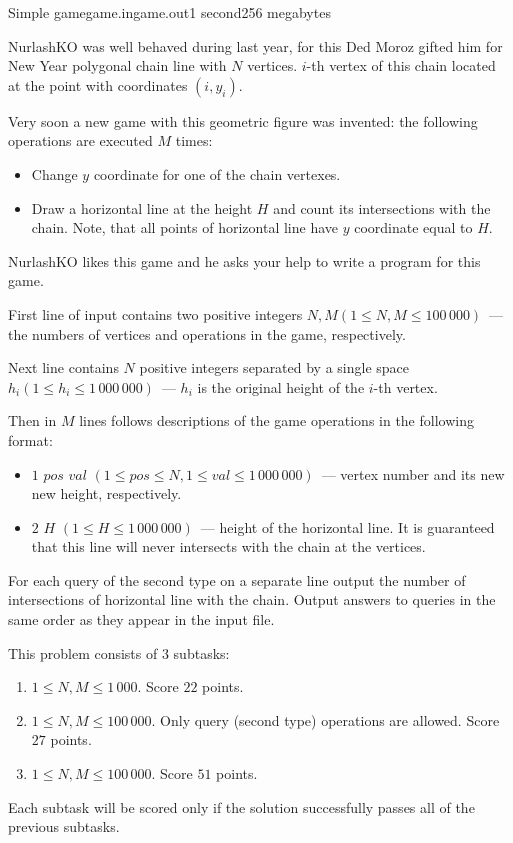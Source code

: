 \begin{problem}{Simple game}{game.in}{game.out}{1 second}{256 megabytes}

NurlashKO was well behaved during last year, for this Ded Moroz gifted him for New Year polygonal chain line with $N$ vertices. $i$-th vertex of this chain located at the point with coordinates $(i, y_i)$.

Very soon a new game with this geometric figure was invented: the following operations are executed $M$ times: 
\begin{itemize}  
   \item Change $y$ coordinate for one of the chain vertexes.
   \item Draw a horizontal line at the height $H$ and count its intersections with the chain. Note, that all points of horizontal line have $y$ coordinate equal to $H$.
\end{itemize}

NurlashKO likes this game and he asks your help to write a program for this game.


\InputFile
First line of input contains two positive integers $N, M (1 \leq N, M \leq 100\,000)$~--- the numbers of vertices and operations in the game, respectively.

Next line contains $N$ positive integers separated by a single space $h_i (1 \leq h_i \leq 1\,000\,000)$~--- $h_i$ is the original height of the $i$-th vertex.

Then in $M$ lines follows descriptions of the game operations in the following format:
\begin{itemize}
\item $1$ $pos$ $val$ $(1 \leq pos \leq N, 1 \leq val \leq 1\,000\,000)$~--- vertex number and its new new height, respectively.
\item $2$ $H$ $(1 \leq H \leq 1\,000\,000)$~--- height of the horizontal line. It is guaranteed that this line will never intersects with the chain at the vertices.
\end{itemize}

\OutputFile
For each query of the second type on a separate line output the number of intersections of horizontal line with the chain. Output answers to queries in the same order as they appear in the input file.


\Scoring
This problem consists of 3 subtasks:
\begin{enumerate}
\item $1 \leq N, M \leq 1\,000$. Score $22$ points.
\item $1 \leq N, M \leq 100\,000$. Only query (second type) operations are allowed. Score $27$ points.
\item $1 \leq N, M \leq 100\,000$. Score $51$ points.
\end{enumerate}

Each subtask will be scored only if the solution successfully passes all of the previous subtasks.

\Example

\begin{example}
%
\end{example}

\end{problem}

